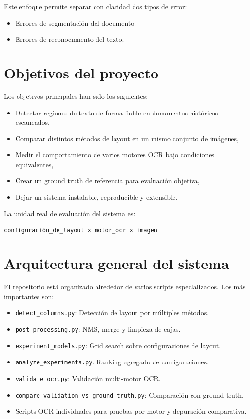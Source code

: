 \documentclass[11pt, a4paper]{article}
\begin{document}
Este enfoque permite separar con claridad dos tipos de error:

\begin{itemize}
    \item Errores de segmentaci\'on del documento,
    \item Errores de reconocimiento del texto.
\end{itemize}

\section{Objetivos del proyecto}

Los objetivos principales han sido los siguientes:

\begin{itemize}
    \item Detectar regiones de texto de forma fiable en documentos hist\'oricos escaneados,
    \item Comparar distintos m\'etodos de layout en un mismo conjunto de im\'agenes,
    \item Medir el comportamiento de varios motores OCR bajo condiciones equivalentes,
    \item Crear un ground truth de referencia para evaluaci\'on objetiva,
    \item Dejar un sistema instalable, reproducible y extensible.
\end{itemize}

La unidad real de evaluaci\'on del sistema es:

\begin{center}
\texttt{configuraci\'on\_de\_layout x motor\_ocr x imagen}
\end{center}

\section{Arquitectura general del sistema}

El repositorio est\'a organizado alrededor de varios scripts especializados. Los m\'as
importantes son:

\begin{itemize}
    \item \texttt{detect\_columns.py}: Detecci\'on de layout por m\'ultiples m\'etodos.
    \item \texttt{post\_processing.py}: NMS, merge y limpieza de cajas.
    \item \texttt{experiment\_models.py}: Grid search sobre configuraciones de layout.
    \item \texttt{analyze\_experiments.py}: Ranking agregado de configuraciones.
    \item \texttt{validate\_ocr.py}: Validaci\'on multi-motor OCR.
    \item \texttt{compare\_validation\_vs\_ground\_truth.py}: Comparaci\'on con ground truth.
    \item Scripts OCR individuales para pruebas por motor y depuraci\'on comparativa.
\end{itemize}
\end{document}
